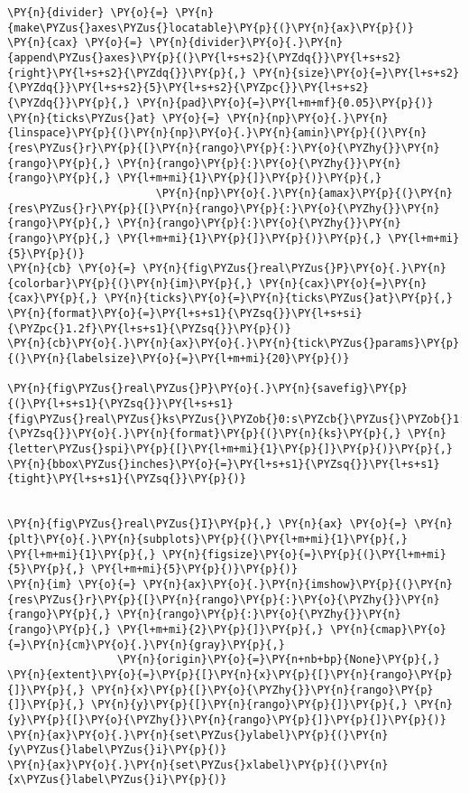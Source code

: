 \begin{Verbatim}[commandchars=\\\{\}]
\PY{n}{divider} \PY{o}{=} \PY{n}{make\PYZus{}axes\PYZus{}locatable}\PY{p}{(}\PY{n}{ax}\PY{p}{)}
\PY{n}{cax} \PY{o}{=} \PY{n}{divider}\PY{o}{.}\PY{n}{append\PYZus{}axes}\PY{p}{(}\PY{l+s+s2}{\PYZdq{}}\PY{l+s+s2}{right}\PY{l+s+s2}{\PYZdq{}}\PY{p}{,} \PY{n}{size}\PY{o}{=}\PY{l+s+s2}{\PYZdq{}}\PY{l+s+s2}{5}\PY{l+s+s2}{\PYZpc{}}\PY{l+s+s2}{\PYZdq{}}\PY{p}{,} \PY{n}{pad}\PY{o}{=}\PY{l+m+mf}{0.05}\PY{p}{)}
\PY{n}{ticks\PYZus{}at} \PY{o}{=} \PY{n}{np}\PY{o}{.}\PY{n}{linspace}\PY{p}{(}\PY{n}{np}\PY{o}{.}\PY{n}{amin}\PY{p}{(}\PY{n}{res\PYZus{}r}\PY{p}{[}\PY{n}{rango}\PY{p}{:}\PY{o}{\PYZhy{}}\PY{n}{rango}\PY{p}{,} \PY{n}{rango}\PY{p}{:}\PY{o}{\PYZhy{}}\PY{n}{rango}\PY{p}{,} \PY{l+m+mi}{1}\PY{p}{]}\PY{p}{)}\PY{p}{,}
                       \PY{n}{np}\PY{o}{.}\PY{n}{amax}\PY{p}{(}\PY{n}{res\PYZus{}r}\PY{p}{[}\PY{n}{rango}\PY{p}{:}\PY{o}{\PYZhy{}}\PY{n}{rango}\PY{p}{,} \PY{n}{rango}\PY{p}{:}\PY{o}{\PYZhy{}}\PY{n}{rango}\PY{p}{,} \PY{l+m+mi}{1}\PY{p}{]}\PY{p}{)}\PY{p}{,} \PY{l+m+mi}{5}\PY{p}{)} 
\PY{n}{cb} \PY{o}{=} \PY{n}{fig\PYZus{}real\PYZus{}P}\PY{o}{.}\PY{n}{colorbar}\PY{p}{(}\PY{n}{im}\PY{p}{,} \PY{n}{cax}\PY{o}{=}\PY{n}{cax}\PY{p}{,} \PY{n}{ticks}\PY{o}{=}\PY{n}{ticks\PYZus{}at}\PY{p}{,} \PY{n}{format}\PY{o}{=}\PY{l+s+s1}{\PYZsq{}}\PY{l+s+si}{\PYZpc{}1.2f}\PY{l+s+s1}{\PYZsq{}}\PY{p}{)}
\PY{n}{cb}\PY{o}{.}\PY{n}{ax}\PY{o}{.}\PY{n}{tick\PYZus{}params}\PY{p}{(}\PY{n}{labelsize}\PY{o}{=}\PY{l+m+mi}{20}\PY{p}{)}

\PY{n}{fig\PYZus{}real\PYZus{}P}\PY{o}{.}\PY{n}{savefig}\PY{p}{(}\PY{l+s+s1}{\PYZsq{}}\PY{l+s+s1}{fig\PYZus{}real\PYZus{}ks\PYZus{}\PYZob{}0:s\PYZcb{}\PYZus{}\PYZob{}1:s\PYZcb{}}\PY{l+s+s1}{\PYZsq{}}\PY{o}{.}\PY{n}{format}\PY{p}{(}\PY{n}{ks}\PY{p}{,} \PY{n}{letter\PYZus{}spi}\PY{p}{[}\PY{l+m+mi}{1}\PY{p}{]}\PY{p}{)}\PY{p}{,} \PY{n}{bbox\PYZus{}inches}\PY{o}{=}\PY{l+s+s1}{\PYZsq{}}\PY{l+s+s1}{tight}\PY{l+s+s1}{\PYZsq{}}\PY{p}{)}


\PY{n}{fig\PYZus{}real\PYZus{}I}\PY{p}{,} \PY{n}{ax} \PY{o}{=} \PY{n}{plt}\PY{o}{.}\PY{n}{subplots}\PY{p}{(}\PY{l+m+mi}{1}\PY{p}{,} \PY{l+m+mi}{1}\PY{p}{,} \PY{n}{figsize}\PY{o}{=}\PY{p}{(}\PY{l+m+mi}{5}\PY{p}{,} \PY{l+m+mi}{5}\PY{p}{)}\PY{p}{)}
\PY{n}{im} \PY{o}{=} \PY{n}{ax}\PY{o}{.}\PY{n}{imshow}\PY{p}{(}\PY{n}{res\PYZus{}r}\PY{p}{[}\PY{n}{rango}\PY{p}{:}\PY{o}{\PYZhy{}}\PY{n}{rango}\PY{p}{,} \PY{n}{rango}\PY{p}{:}\PY{o}{\PYZhy{}}\PY{n}{rango}\PY{p}{,} \PY{l+m+mi}{2}\PY{p}{]}\PY{p}{,} \PY{n}{cmap}\PY{o}{=}\PY{n}{cm}\PY{o}{.}\PY{n}{gray}\PY{p}{,}
                 \PY{n}{origin}\PY{o}{=}\PY{n+nb+bp}{None}\PY{p}{,} \PY{n}{extent}\PY{o}{=}\PY{p}{[}\PY{n}{x}\PY{p}{[}\PY{n}{rango}\PY{p}{]}\PY{p}{,} \PY{n}{x}\PY{p}{[}\PY{o}{\PYZhy{}}\PY{n}{rango}\PY{p}{]}\PY{p}{,} \PY{n}{y}\PY{p}{[}\PY{n}{rango}\PY{p}{]}\PY{p}{,} \PY{n}{y}\PY{p}{[}\PY{o}{\PYZhy{}}\PY{n}{rango}\PY{p}{]}\PY{p}{]}\PY{p}{)}
\PY{n}{ax}\PY{o}{.}\PY{n}{set\PYZus{}ylabel}\PY{p}{(}\PY{n}{y\PYZus{}label\PYZus{}i}\PY{p}{)}
\PY{n}{ax}\PY{o}{.}\PY{n}{set\PYZus{}xlabel}\PY{p}{(}\PY{n}{x\PYZus{}label\PYZus{}i}\PY{p}{)}


\end{Verbatim}

